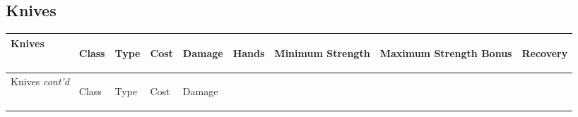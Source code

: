 \documentclass[twoside]{book}
\begin{document}
    

\subsection{Knives}
    
\begin{longtable}{p{1.25in}llllp{2em}p{3em}p{3em}l} 
  Knives
  &
  \begin{turn}{70}{Class}\end{turn}
          
  &
  \begin{turn}{70}{Type}\end{turn}
          
  &
  \begin{turn}{70}{Cost}\end{turn}
          
  &
  \begin{turn}{70}{Damage}\end{turn}
          
  &
  \begin{turn}{70}{Hands}\end{turn}
          
  &
  \begin{turn}{70}{Minimum Strength}\end{turn}
          
  &
  \begin{turn}{70}{Maximum Strength Bonus}\end{turn}
          
  &
  \begin{turn}{70}{Recovery}\end{turn}
          
  \\
  \hline
  \hline
  \endfirsthead
  Knives \textit{cont'd}
        
  &
  \begin{turn}{70}{Class}\end{turn}
          
  &
  \begin{turn}{70}{Type}\end{turn}
          
  &
  \begin{turn}{70}{Cost}\end{turn}
          
  &
  \begin{turn}{70}{Damage}\end{turn}
          

\end{longtable}
\end{document}
